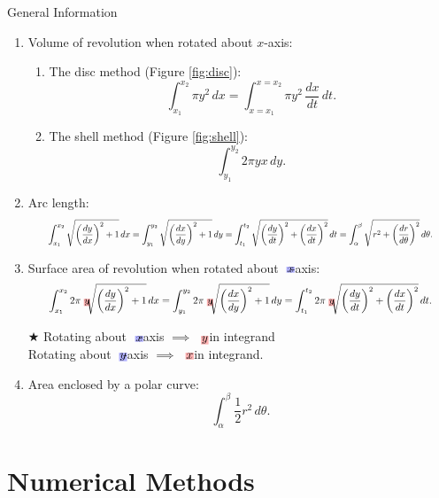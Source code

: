\documentclass[oneside]{book}
\newcommand{\highlight}[2][red!50]{\mathpalette{\highlightwithstyle[#1]}{#2}}
\newcommand{\highlightwithstyle}[3][red!50]{
  \begingroup                         %
    \sbox0{$\mathsurround 0pt #2#3$}%
    \setlength{\fboxsep}{.5pt}        %
    \sbox2{\hspace{-.5pt}%
      \colorbox{#1}{\usebox0}%
    }%
    \dp2=\dp0 \ht2=\ht0 \wd2=\wd0     %
    \box2                             %
  \endgroup                           %
}
\begin{document}
\begin{stbox}{General Information}
  \begin{enumerate}
    \item Volume of revolution when rotated about \(x\)-axis: 
  \begin{enumerate}
    \item The disc method (Figure \ref{fig:disc}):
    \[\int_{x_1}^{x_2}\pi y^2\,dx=\int_{x=x_1}^{x=x_2}\pi y^2\, \frac{dx}{dt}\,dt.\]
    \item The shell method (Figure \ref{fig:shell}):
    \[\int_{y_1}^{y_2}2\pi yx \,dy.\]
  \end{enumerate}
  \item Arc length:
  \begin{equation*}
    \resizebox{0.9\hsize}{!}{\(\displaystyle\int_{x_1}^{x_2}\sqrt{\left(\frac{dy}{dx}\right)^2+1}\,dx=\int_{y_1}^{y_2} \sqrt{\left(\frac{dx}{dy}\right)^2+1}\,dy=\int_{t_1}^{t_2}\sqrt{\left(\frac{dy}{dt}\right)^2+\left(\frac{dx}{dt}\right)^2}\,dt=\int_{\alpha}^{\beta}\sqrt{r^2+\left(\frac{dr}{d\theta}\right)^2}\,d\theta.\)}
    \end{equation*}
  \item Surface area of revolution when rotated about \(\highlight[blue!30]{x}\)-axis: 
  \begin{equation*}
    \resizebox{0.9\hsize}{!}{\(\displaystyle\int_{x_1}^{x_2}2\pi \highlight[red!30]{y} \sqrt{\left(\frac{dy}{dx}\right)^2+1}\,dx=\int_{y_1}^{y_2}2\pi \highlight[red!30]{y} \sqrt{\left(\frac{dx}{dy}\right)^2+1}\,dy=\int_{t_1}^{t_2}2\pi \highlight[red!30]{y} \sqrt{\left(\frac{dy}{dt}\right)^2+\left(\frac{dx}{dt}\right)^2}\,dt.\)}
    \end{equation*}
  \begin{flushleft}
    \(\bigstar\) Rotating about \(\highlight[blue!30]{x}\)-axis \(\implies\) \(\highlight[red!30]{y}\) in integrand\\
    \hphantom{\(\bigstar\)} Rotating about \(\highlight[blue!30]{y}\)-axis \(\implies\) \(\highlight[red!30]{x}\) in integrand.
  \end{flushleft}
  \item Area enclosed by a polar curve:
  \[\int_{\alpha}^{\beta}\frac{1}{2}r^2\,d\theta.\]
  \end{enumerate}
\end{stbox}
\section{Numerical Methods}
\end{document}
